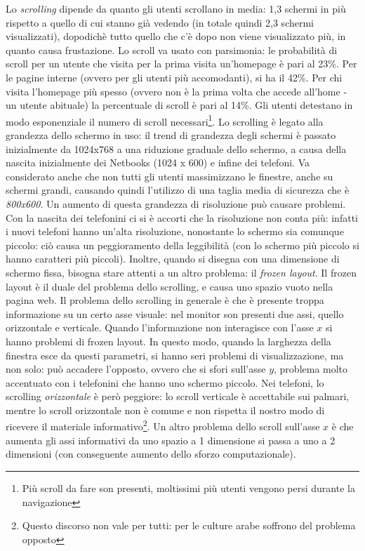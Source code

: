 Lo \textit{scrolling} dipende da quanto gli utenti scrollano in media: 1,3 schermi in pi\`u rispetto a quello di cui stanno gi\`a vedendo (in totale quindi 2,3 schermi visualizzati), dopodich\`e tutto quello che c'\`e dopo non viene visualizzato pi\`u, in quanto causa frustazione. Lo scroll va usato con parsimonia: le probabilit\`a di scroll per un utente che visita per la prima visita un'homepage \`e pari al 23\%. Per le pagine interne (ovvero per gli utenti pi\`u accomodanti), si ha il 42\%. Per chi visita l'homepage pi\`u spesso (ovvero non \`e la prima volta che accede all'home - un utente abituale) la percentuale di scroll \`e pari al 14\%. Gli utenti detestano in modo esponenziale il numero di scroll necessari\footnote{Pi\`u scroll da fare son presenti, moltissimi pi\`u utenti vengono persi durante la navigazione}. Lo scrolling \`e legato alla grandezza dello schermo in uso: il trend di grandezza degli schermi \`e passato inizialmente da 1024x768 a una riduzione graduale dello schermo, a causa della nascita inizialmente dei Netbooks (1024 x 600) e infine dei telefoni. Va considerato anche che non tutti gli utenti massimizzano le finestre, anche su schermi grandi, causando quindi l'utilizzo di una taglia media di sicurezza che \`e \textit{800x600}. Un aumento di questa grandezza di risoluzione pu\`o causare problemi. Con la nascita dei telefonini ci si \`e accorti che la risoluzione non conta pi\`u: infatti i nuovi telefoni hanno un'alta risoluzione, nonostante lo schermo sia comunque piccolo: ci\`o causa un peggioramento della leggibilit\`a (con lo schermo pi\`u piccolo si hanno caratteri pi\`u piccoli). Inoltre, quando si disegna con una dimensione di schermo fissa, bisogna stare attenti a un altro problema: il \textit{frozen layout}. Il frozen layout \`e il duale del problema dello scrolling, e causa uno spazio vuoto nella pagina web. Il problema dello scrolling in generale \`e che \`e presente troppa informazione su un certo asse visuale: nel monitor son presenti due assi, quello orizzontale e verticale. Quando l'informazione non interagisce con l'asse $x$ si hanno problemi di frozen layout. In questo modo, quando la larghezza della finestra esce da questi parametri, si hanno seri problemi di visualizzazione, ma non solo: pu\`o accadere l'opposto, ovvero che si sfori sull'asse $y$, problema molto accentuato con i telefonini che hanno uno schermo piccolo.
Nei telefoni, lo scrolling \textit{orizzontale} \`e per\`o peggiore: lo scroll verticale \`e accettabile sui palmari, mentre lo scroll orizzontale non \`e comune e non rispetta il nostro modo di ricevere il materiale informativo\footnote{Questo discorso non vale per tutti: per le culture arabe soffrono del problema opposto}. Un altro problema dello scroll sull'asse $x$ \`e che aumenta gli assi informativi da uno spazio a 1 dimensione si passa a uno a 2 dimensioni (con conseguente aumento dello sforzo computazionale).
